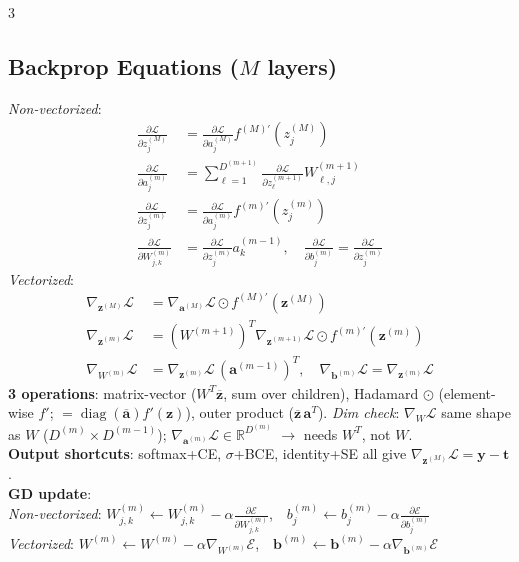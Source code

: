 \documentclass[10pt]{article}
\newcommand{\vt}{\mathbf{t}}
\newcommand{\cE}{\mathcal{E}}
\newcommand{\cL}{\mathcal{L}}
\newcommand{\sub}[1]{\textit{#1}:}  %
\newcommand{\va}{\mathbf{a}}
\newcommand{\vb}{\mathbf{b}}
\newcommand{\vz}{\mathbf{z}}
\newcommand{\vy}{\mathbf{y}}
\begin{document}
\begin{multicols*}{3}
\subsection{Backprop Equations ($M$ layers)}
\sub{Non-vectorized}
\begin{align*}
\tfrac{\partial\cL}{\partial z^{(M)}_j}&=\tfrac{\partial\cL}{\partial a^{(M)}_j}f^{(M)\prime}(z^{(M)}_j)\\
\tfrac{\partial\cL}{\partial a^{(m)}_j}&=\textstyle\sum_{\ell=1}^{D^{(m+1)}}\tfrac{\partial\cL}{\partial z^{(m+1)}_\ell}W^{(m+1)}_{\ell,j}\\
\tfrac{\partial\cL}{\partial z^{(m)}_j}&=\tfrac{\partial\cL}{\partial a^{(m)}_j}f^{(m)\prime}(z^{(m)}_j)\\
\tfrac{\partial\cL}{\partial W^{(m)}_{j,k}}&=\tfrac{\partial\cL}{\partial z^{(m)}_j}a^{(m-1)}_k,\quad\tfrac{\partial\cL}{\partial b^{(m)}_j}=\tfrac{\partial\cL}{\partial z^{(m)}_j}
\end{align*}
\sub{Vectorized}
\begin{align*}
\nabla_{\vz^{(M)}}\cL&=\nabla_{\va^{(M)}}\cL\odot f^{(M)\prime}(\vz^{(M)})\\
\nabla_{\vz^{(m)}}\cL&=(W^{(m+1)})^T\nabla_{\vz^{(m+1)}}\cL\odot f^{(m)\prime}(\vz^{(m)})\\
\nabla_{W^{(m)}}\cL&=\nabla_{\vz^{(m)}}\cL\,(\va^{(m-1)})^T,\quad\nabla_{\vb^{(m)}}\cL=\nabla_{\vz^{(m)}}\cL
\end{align*}
\textbf{3 operations}: matrix-vector ($W^T\overline{\vz}$, sum over children), Hadamard $\odot$ (element-wise $f'$; $=\operatorname{diag}(\overline{\va})f'(\vz)$), outer product ($\overline{\vz}\,\va^T$). \sub{Dim check} $\nabla_W\cL$ same shape as $W$ ($D^{(m)}\times D^{(m-1)}$); $\nabla_{\va^{(m)}}\cL\in\mathbb R^{D^{(m)}}$ $\to$ needs $W^T$, not $W$.\\
\textbf{Output shortcuts}: softmax+CE, $\sigma$+BCE, identity+SE all give $\nabla_{\vz^{(M)}}\cL=\vy-\vt$.\\
\textbf{GD update}:\\
\sub{Non-vectorized} $W^{(m)}_{j,k}\leftarrow W^{(m)}_{j,k}-\alpha\frac{\partial\cE}{\partial W^{(m)}_{j,k}}$,\ \ $b^{(m)}_j\leftarrow b^{(m)}_j-\alpha\frac{\partial\cE}{\partial b^{(m)}_j}$\\
\sub{Vectorized} $W^{(m)}\leftarrow W^{(m)}-\alpha\nabla_{W^{(m)}}\cE$,\ \ $\vb^{(m)}\leftarrow\vb^{(m)}-\alpha\nabla_{\vb^{(m)}}\cE$


\end{multicols*}
\end{document}
